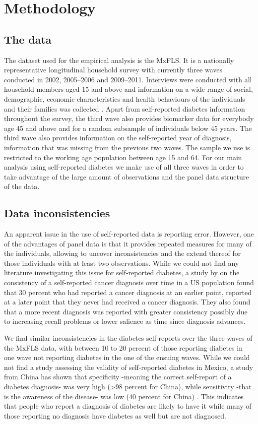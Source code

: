 \section{\noindent \label{sec:Methodology}Methodology}
\subsection{The data}
The dataset used for the empirical analysis is the \acf{MxFLS}.
It is a nationally representative longitudinal household survey with
currently three waves conducted in 2002, 2005--2006 and 2009--2011.
Interviews were conducted with all household members aged 15 and above
and information on a wide range of social, demographic, economic characteristics
and health behaviours of the individuals and their families was collected
\citep{Rubalcava2013}. Apart from self-reported diabetes information
throughout the survey, the third wave also provides biomarker data
for everybody age 45 and above and for a random subsample of individuals
below 45 years. The third wave also provides information on the self-reported
year of diagnosis, information that was missing from the previous
two waves. The sample we use is restricted to the working age population
between age 15 and 64. For our main analysis using self-reported diabetes
we make use of all three waves in order to take advantage of the large
amount of observations and the panel data structure of the data.
\subsection{Data inconsistencies}

An apparent issue in the use of self-reported data is reporting error.
However, one of the advantages of panel data is that it provides repeated
measures for many of the individuals, allowing to uncover inconsistencies
and the extend thereof for those individuals with at least two observations.
While we could not find any literature investigating this issue for
self-reported diabetes, a study by \citet{Zajacova2010} on the consistency
of a self-reported cancer diagnosis over time in a US population found
that 30 percent who had reported a cancer diagnosis at an earlier
point, reported at a later point that they never had received a cancer
diagnosis. They also found that a more recent diagnosis was reported
with greater consistency possibly due to increasing recall problems
or lower salience as time since diagnosis advances. 

We find similar inconsistencies in the diabetes self-reports over
the three waves of the \ac{MxFLS} data, with between 10 to 20 percent
of those reporting diabetes in one wave not reporting diabetes in
the one of the ensuing waves. While we could not find a study assessing
the validity of self-reported diabetes in Mexico, a study from China
has shown that specificity -meaning the correct self-report of a diabetes
diagnosis- was very high (>98 percent for China), while sensitivity
-that is the awareness of the disease- was low (40 percent for China)
\citep{Yuan2015a}. This indicates that people who report a diagnosis
of diabetes are likely to have it while many of those reporting no
diagnosis have diabetes as well but are not diagnosed. 

